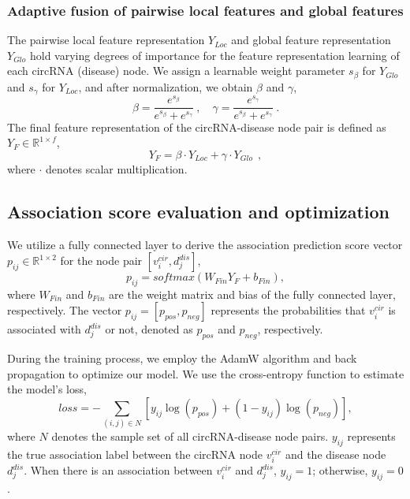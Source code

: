 \documentclass[journal=jcisd8,manuscript=article]{achemso}
\begin{document}
\subsubsection{Adaptive fusion of pairwise local features and global features}
\vspace{-0.3cm}
The pairwise local feature representation ${Y_{Loc}}$ and global feature representation ${Y_{Glo}}$ hold varying degrees of importance for the feature representation learning of each circRNA (disease) node. We assign a learnable weight parameter $s_{\beta}$ for ${Y_{Glo}}$ and $s_{\gamma}$ for ${Y_{Loc}}$, and after normalization, we obtain $\beta$ and $\gamma$,
\begin{equation}
    \beta = \frac{e^{s_{\beta}}}{e^{s_{\beta}} + e^{s_{\gamma}}}\ , \quad \gamma = \frac{e^{s_{\gamma}}}{e^{s_{\beta}} + e^{s_{\gamma}}}\ .
\end{equation}
The final feature representation of the circRNA-disease node pair is defined as ${Y}_{F} \in \mathbb{R}^{1\times f}$,
\begin{equation}
    {Y}_{F} = \beta \cdot {Y_{Loc}} + \gamma \cdot {Y_{Glo}}\ \ ,
\end{equation}
where $\cdot$ denotes scalar multiplication.

\vspace{-0.5cm}

\subsection{Association score evaluation and optimization}
\vspace{-0.3cm}
We utilize a fully connected layer to derive the association prediction score vector $p_{ij} \in \mathbb{R}^{1\times 2}$ for the node pair $[v_i^{cir}, d_j^{dis}]$,
\begin{equation}
    p_{ij} = softmax(W_{Fin}Y_{F} + b_{Fin}),
\end{equation}
where $W_{Fin}$ and $b_{Fin}$ are the weight matrix and bias of the fully connected layer, respectively. The vector $p_{ij} = [p_{pos}, p_{neg}]$ represents the probabilities that $v_i^{cir}$ is associated with $d_j^{dis}$ or not, denoted as $p_{pos}$ and $p_{neg}$, respectively.

During the training process, we employ the AdamW algorithm and back propagation to optimize our model. We use the cross-entropy function to estimate the model's loss,
\begin{equation}
    loss = - \sum\limits_{(i,j) \in N} \left[ y_{ij} \log (p_{pos}) + (1 - y_{ij}) \log (p_{neg}) \right],
\end{equation}
where $N$ denotes the sample set of all circRNA-disease node pairs. $y_{ij}$ represents the true association label between the circRNA node $v_i^{cir}$ and the disease node $d_j^{dis}$. When there is an association between $v_i^{cir}$ and $d_j^{dis}$, $y_{ij} = 1$; otherwise, $y_{ij} = 0$.
\end{document}
